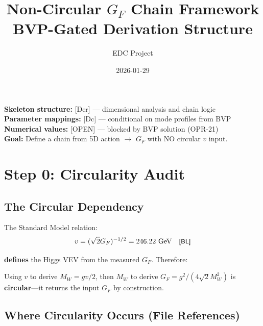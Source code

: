 \documentclass[11pt]{article}
\title{Non-Circular $G_F$ Chain Framework\\[0.5em]\large BVP-Gated Derivation Structure}
\author{EDC Project}
\date{2026-01-29}
\newcommand{\tagDer}{{\small\textsf{[Der]}}}
\newcommand{\tagDc}{{\small\textsf{[Dc]}}}
\newcommand{\tagBL}{{\small\textsf{[BL]}}}
\newcommand{\tagOPEN}{{\small\textsf{[OPEN]}}}
\begin{document}
\maketitle

\begin{tcolorbox}[colback=blue!5!white, colframe=blue!75!black, title=Epistemic Status]
\textbf{Skeleton structure:} \tagDer{} --- dimensional analysis and chain logic \\
\textbf{Parameter mappings:} \tagDc{} --- conditional on mode profiles from BVP \\
\textbf{Numerical values:} \tagOPEN{} --- blocked by BVP solution (OPR-21) \\[0.5em]
\textbf{Goal:} Define a chain from 5D action $\to$ $G_F$ with NO circular $v$ input.
\end{tcolorbox}

\section{Step 0: Circularity Audit}

\subsection{The Circular Dependency}

The Standard Model relation:
\begin{equation}
    v = (\sqrt{2} G_F)^{-1/2} = 246.22 \text{ GeV} \quad \tagBL{}
\end{equation}

\textbf{defines} the Higgs VEV from the measured $G_F$. Therefore:

\begin{tcolorbox}[colback=red!5!white, colframe=red!75!black, title=Circularity Caveat]
Using $v$ to derive $M_W = gv/2$, then $M_W$ to derive $G_F = g^2/(4\sqrt{2}M_W^2)$
is \textbf{circular}---it returns the input $G_F$ by construction.
\end{tcolorbox}

\subsection{Where Circularity Occurs (File References)}
\end{document}
